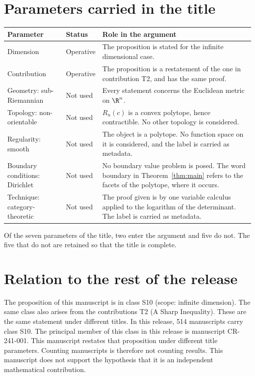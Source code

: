 \documentclass[11pt]{article}
\begin{document}
\section{Parameters carried in the title}\label{sec:params}
\begin{center}
\small
\begin{tabular}{p{}p{}p{}}
\toprule
Parameter & Status & Role in the argument \\
\midrule
Dimension & Operative & The proposition is stated for the infinite dimensional case. \\
Contribution & Operative & The proposition is a restatement of the one in contribution T2, and has the same proof. \\
Geometry: sub-Riemannian & Not used & Every statement concerns the Euclidean metric on $\R^n$. \\
Topology: non-orientable & Not used & $R_n(c)$ is a convex polytope, hence contractible. No other topology is considered. \\
Regularity: smooth & Not used & The object is a polytope. No function space on it is considered, and the label is carried as metadata. \\
Boundary conditions: Dirichlet & Not used & No boundary value problem is posed. The word boundary in Theorem~\ref{thm:main} refers to the facets of the polytope, where it occurs. \\
Technique: category-theoretic & Not used & The proof given is by one variable calculus applied to the logarithm of the determinant. The label is carried as metadata. \\
\bottomrule
\end{tabular}
\end{center}
Of the seven parameters of the title, two enter the argument and five do not. The five that do not are retained so that the title is complete.

\section{Relation to the rest of the release}
The proposition of this manuscript is in class S10 (scope: infinite dimension). The same class also arises from the contributions T2 (A Sharp Inequality). These are the same statement under different titles.
In this release, 514 manuscripts carry class S10. The principal member of this class in this release is manuscript CR-241-001. This manuscript restates that proposition under different title parameters.
Counting manuscripts is therefore not counting results. This manuscript does not support the hypothesis that it is an independent mathematical contribution.
\end{document}

